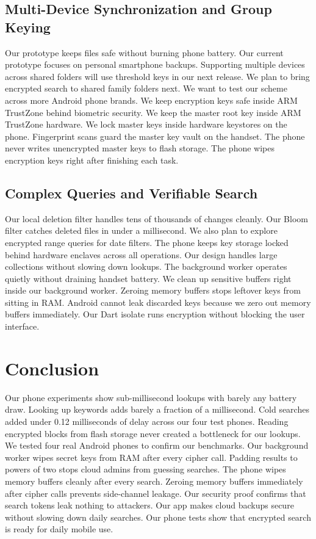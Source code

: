 \documentclass[10pt, conference, letterpaper]{IEEEtran}
\begin{document}
\subsection{Multi-Device Synchronization and Group Keying}
Our prototype keeps files safe without burning phone battery. Our current prototype focuses on personal smartphone backups. Supporting multiple devices across shared folders will use threshold keys in our next release. We plan to bring encrypted search to shared family folders next. We want to test our scheme across more Android phone brands. We keep encryption keys safe inside ARM TrustZone behind biometric security. We keep the master root key inside ARM TrustZone hardware. We lock master keys inside hardware keystores on the phone. Fingerprint scans guard the master key vault on the handset. The phone never writes unencrypted master keys to flash storage. The phone wipes encryption keys right after finishing each task.

\subsection{Complex Queries and Verifiable Search}
Our local deletion filter handles tens of thousands of changes cleanly. Our Bloom filter catches deleted files in under a millisecond. We also plan to explore encrypted range queries for date filters. The phone keeps key storage locked behind hardware enclaves across all operations. Our design handles large collections without slowing down lookups. The background worker operates quietly without draining handset battery. We clean up sensitive buffers right inside our background worker. Zeroing memory buffers stops leftover keys from sitting in RAM. Android cannot leak discarded keys because we zero out memory buffers immediately. Our Dart isolate runs encryption without blocking the user interface.

\section{Conclusion}
Our phone experiments show sub-millisecond lookups with barely any battery draw. Looking up keywords adds barely a fraction of a millisecond. Cold searches added under 0.12 milliseconds of delay across our four test phones. Reading encrypted blocks from flash storage never created a bottleneck for our lookups. We tested four real Android phones to confirm our benchmarks. Our background worker wipes secret keys from RAM after every cipher call. Padding results to powers of two stops cloud admins from guessing searches. The phone wipes memory buffers cleanly after every search. Zeroing memory buffers immediately after cipher calls prevents side-channel leakage. Our security proof confirms that search tokens leak nothing to attackers. Our app makes cloud backups secure without slowing down daily searches. Our phone tests show that encrypted search is ready for daily mobile use.
\end{document}
